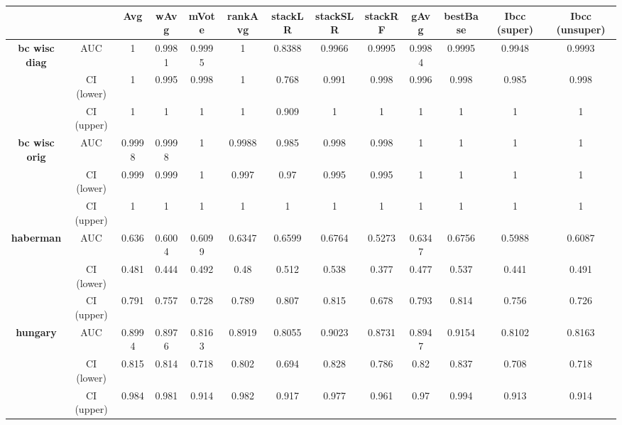 \documentclass{document}
\begin{document}
\clearpage
\begin{table}[b]
\small
\begin{tabular}
    {|c|c||c|c|c|c|c|c|c|c|c|c|c|}
    \hline
    && \textbf{Avg} & \textbf{wAvg} & \textbf{mVote} & \textbf{rankAvg} & \textbf{stackLR} & \textbf{stackSLR} & \textbf{stackRF} & \textbf{gAvg} & \textbf{bestBase} & \textbf{Ibcc (super)} & \textbf{Ibcc (unsuper)}\\ \hline

    \textbf{bc wisc diag}&AUC & 1 & 0.9981 & 0.9995 & 1 & 0.8388 & 0.9966 & 0.9995 & 0.9984 & 0.9995 & 0.9948 & 0.9993\\
    &CI (lower) & 1 & 0.995 & 0.998 & 1 & 0.768 & 0.991 & 0.998 & 0.996 & 0.998 & 0.985 & 0.998\\
    &CI (upper) & 1 & 1 & 1 & 1 & 0.909 & 1 & 1 & 1 & 1 & 1 & 1\\ \hline

    \textbf{bc wisc orig}&AUC & 0.9998 & 0.9998 & 1 & 0.9988 & 0.985 & 0.998 & 0.998 & 1 & 1 & 1 & 1\\
    &CI (lower) & 0.999 & 0.999 & 1 & 0.997 & 0.97 & 0.995 & 0.995 & 1 & 1 & 1 & 1\\
    &CI (upper) & 1 & 1 & 1 & 1 & 1 & 1 & 1 & 1 & 1 & 1 & 1\\ \hline

    \textbf{haberman}&AUC & 0.636 & 0.6004 & 0.6099 & 0.6347 & 0.6599 & 0.6764 & 0.5273 & 0.6347 & 0.6756 & 0.5988 & 0.6087\\
    &CI (lower) & 0.481 & 0.444 & 0.492 & 0.48 & 0.512 & 0.538 & 0.377 & 0.477 & 0.537 & 0.441 & 0.491\\
    &CI (upper) & 0.791 & 0.757 & 0.728 & 0.789 & 0.807 & 0.815 & 0.678 & 0.793 & 0.814 & 0.756 & 0.726\\ \hline

    \textbf{hungary}&AUC & 0.8994 & 0.8976 & 0.8163 & 0.8919 & 0.8055 & 0.9023 & 0.8731 & 0.8947 & 0.9154 & 0.8102 & 0.8163\\
    &CI (lower) & 0.815 & 0.814 & 0.718 & 0.802 & 0.694 & 0.828 & 0.786 & 0.82 & 0.837 & 0.708 & 0.718\\
    &CI (upper) & 0.984 & 0.981 & 0.914 & 0.982 & 0.917 & 0.977 & 0.961 & 0.97 & 0.994 & 0.913 & 0.914\\ \hline


\end{tabular}
\end{table}
\end{document}
